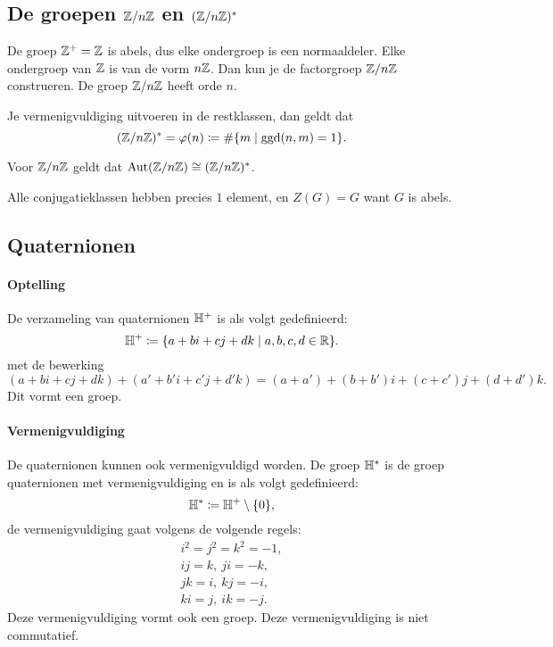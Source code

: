 \subsection{De groepen  \texorpdfstring{\(\mathbb{Z}/n\mathbb{Z}\)}{z/nz} en \texorpdfstring{\((\mathbb{Z}/n\mathbb{Z})^{*}\)}{z/nz*}}
De groep \(\mathbb{Z}^{+}=\mathbb{Z}\) is abels, dus elke ondergroep is een normaaldeler. Elke ondergroep van \(\mathbb{Z}\) is van de vorm \(n\mathbb{Z}\). Dan kun je de factorgroep \(\mathbb{Z}/n\mathbb{Z}\) construeren. De groep \(\mathbb{Z}/n\mathbb{Z}\) heeft orde \(n\).

Je vermenigvuldiging uitvoeren in de restklassen, dan geldt dat
\[
    (\mathbb{Z}/n\mathbb{Z})^{*}=\varphi(n)\coloneqq\#\{m\mid\operatorname{ggd}(n,m)=1\}.
\]

Voor \(\mathbb{Z}/n\mathbb{Z}\) geldt dat \(\operatorname{Aut}(\mathbb{Z}/n\mathbb{Z})\cong(\mathbb{Z}/n\mathbb{Z})^{*}\).

Alle conjugatieklassen hebben precies \(1\) element, en \(Z(G)=G\) want \(G\) is abels.

\subsection{Quaternionen}
\paragraph{Optelling} De verzameling van quaternionen \(\mathbb{H}^{+}\) is als volgt gedefinieerd:
\[
    \mathbb{H}^{+}\coloneqq\{a+bi+cj+dk\mid a,b,c,d\in\mathbb{R}\}.
\]
met de bewerking
\[
    (a+bi+cj+dk)+(a'+b'i+c'j+d'k)=(a+a')+(b+b')i+(c+c')j+(d+d')k.
\]
Dit vormt een groep.

\paragraph{Vermenigvuldiging} De quaternionen kunnen ook vermenigvuldigd worden. De groep \(\mathbb{H}^{*}\) is de groep quaternionen met vermenigvuldiging en is als volgt gedefinieerd:
\[
    \mathbb{H}^{*}\coloneqq\mathbb{H}^{+}\setminus\{0\},
\]
de vermenigvuldiging gaat volgens de volgende regels:
\begin{align*}
    i^{2}=j^{2}=k^{2}=-1, \\
    ij=k,\>ji=-k,         \\
    jk=i,\>kj=-i,         \\
    ki=j,\>ik=-j.
\end{align*}
Deze vermenigvuldiging vormt ook een groep. Deze vermenigvuldiging is niet commutatief.

